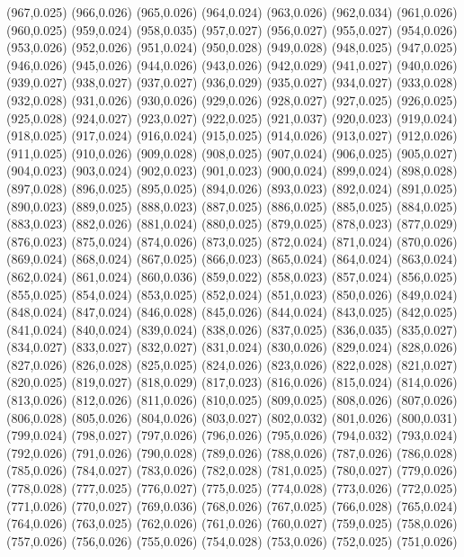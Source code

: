 (967,0.025)
(966,0.026)
(965,0.026)
(964,0.024)
(963,0.026)
(962,0.034)
(961,0.026)
(960,0.025)
(959,0.024)
(958,0.035)
(957,0.027)
(956,0.027)
(955,0.027)
(954,0.026)
(953,0.026)
(952,0.026)
(951,0.024)
(950,0.028)
(949,0.028)
(948,0.025)
(947,0.025)
(946,0.026)
(945,0.026)
(944,0.026)
(943,0.026)
(942,0.029)
(941,0.027)
(940,0.026)
(939,0.027)
(938,0.027)
(937,0.027)
(936,0.029)
(935,0.027)
(934,0.027)
(933,0.028)
(932,0.028)
(931,0.026)
(930,0.026)
(929,0.026)
(928,0.027)
(927,0.025)
(926,0.025)
(925,0.028)
(924,0.027)
(923,0.027)
(922,0.025)
(921,0.037)
(920,0.023)
(919,0.024)
(918,0.025)
(917,0.024)
(916,0.024)
(915,0.025)
(914,0.026)
(913,0.027)
(912,0.026)
(911,0.025)
(910,0.026)
(909,0.028)
(908,0.025)
(907,0.024)
(906,0.025)
(905,0.027)
(904,0.023)
(903,0.024)
(902,0.023)
(901,0.023)
(900,0.024)
(899,0.024)
(898,0.028)
(897,0.028)
(896,0.025)
(895,0.025)
(894,0.026)
(893,0.023)
(892,0.024)
(891,0.025)
(890,0.023)
(889,0.025)
(888,0.023)
(887,0.025)
(886,0.025)
(885,0.025)
(884,0.025)
(883,0.023)
(882,0.026)
(881,0.024)
(880,0.025)
(879,0.025)
(878,0.023)
(877,0.029)
(876,0.023)
(875,0.024)
(874,0.026)
(873,0.025)
(872,0.024)
(871,0.024)
(870,0.026)
(869,0.024)
(868,0.024)
(867,0.025)
(866,0.023)
(865,0.024)
(864,0.024)
(863,0.024)
(862,0.024)
(861,0.024)
(860,0.036)
(859,0.022)
(858,0.023)
(857,0.024)
(856,0.025)
(855,0.025)
(854,0.024)
(853,0.025)
(852,0.024)
(851,0.023)
(850,0.026)
(849,0.024)
(848,0.024)
(847,0.024)
(846,0.028)
(845,0.026)
(844,0.024)
(843,0.025)
(842,0.025)
(841,0.024)
(840,0.024)
(839,0.024)
(838,0.026)
(837,0.025)
(836,0.035)
(835,0.027)
(834,0.027)
(833,0.027)
(832,0.027)
(831,0.024)
(830,0.026)
(829,0.024)
(828,0.026)
(827,0.026)
(826,0.028)
(825,0.025)
(824,0.026)
(823,0.026)
(822,0.028)
(821,0.027)
(820,0.025)
(819,0.027)
(818,0.029)
(817,0.023)
(816,0.026)
(815,0.024)
(814,0.026)
(813,0.026)
(812,0.026)
(811,0.026)
(810,0.025)
(809,0.025)
(808,0.026)
(807,0.026)
(806,0.028)
(805,0.026)
(804,0.026)
(803,0.027)
(802,0.032)
(801,0.026)
(800,0.031)
(799,0.024)
(798,0.027)
(797,0.026)
(796,0.026)
(795,0.026)
(794,0.032)
(793,0.024)
(792,0.026)
(791,0.026)
(790,0.028)
(789,0.026)
(788,0.026)
(787,0.026)
(786,0.028)
(785,0.026)
(784,0.027)
(783,0.026)
(782,0.028)
(781,0.025)
(780,0.027)
(779,0.026)
(778,0.028)
(777,0.025)
(776,0.027)
(775,0.025)
(774,0.028)
(773,0.026)
(772,0.025)
(771,0.026)
(770,0.027)
(769,0.036)
(768,0.026)
(767,0.025)
(766,0.028)
(765,0.024)
(764,0.026)
(763,0.025)
(762,0.026)
(761,0.026)
(760,0.027)
(759,0.025)
(758,0.026)
(757,0.026)
(756,0.026)
(755,0.026)
(754,0.028)
(753,0.026)
(752,0.025)
(751,0.026)
